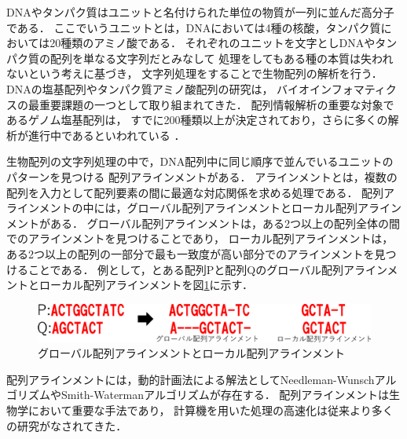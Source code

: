 DNAやタンパク質はユニットと名付けられた単位の物質が一列に並んだ高分子である．
ここでいうユニットとは，DNAにおいては4種の核酸，タンパク質においては20種類のアミノ酸である．
それぞれのユニットを文字としDNAやタンパク質の配列を単なる文字列だとみなして
処理をしてもある種の本質は失われないという考えに基づき，
文字列処理をすることで生物配列の解析を行う．
DNAの塩基配列やタンパク質アミノ酸配列の研究は，
バイオインフォマティクスの最重要課題の一つとして取り組まれてきた．
配列情報解析の重要な対象であるゲノム塩基配列は，
すでに200種類以上が決定されており，さらに多くの解析が進行中であるといわれている
\cite{浅井潔2005バイオインフォマティクス}．

生物配列の文字列処理の中で，DNA配列中に同じ順序で並んでいるユニットのパターンを見つける
配列アラインメントがある\cite{須戸里織2011バイオインフォマティクスゲノム配列から
機能解析へバイオインフォマティクスゲノム配列から機能解析へ}．
アラインメントとは，複数の配列を入力として配列要素の間に最適な対応関係を求める処理である．
配列アラインメントの中には，グローバル配列アラインメントとローカル配列アラインメントがある．
グローバル配列アラインメントは，ある2つ以上の配列全体の間でのアラインメントを見つけることであり，
ローカル配列アラインメントは，ある2つ以上の配列の一部分で最も一致度が高い部分でのアラインメントを見つけることである．
例として，とある配列Pと配列Qのグローバル配列アラインメントとローカル配列アラインメントを図\ref{fig:grlc}に示す．
\begin{figure}[t!]
\begin{center}
\includegraphics[keepaspectratio,scale=0.5]{fig/2/grlc.eps}
\caption{グローバル配列アラインメントとローカル配列アラインメント}
\label{fig:grlc}
\end{center}
\end{figure}

配列アラインメントには，動的計画法による解法としてNeedleman-Wunschアルゴリズム\cite{needleman1970general}やSmith-Watermanアルゴリズム\cite{smith1981identification}が存在する．
配列アラインメントは生物学において重要な手法であり，
計算機を用いた処理の高速化は従来より多くの研究がなされてきた\cite{須戸里織2011gpu,宗川裕馬2008統合開発環境,sandes2011smith,liu2015accelerating,伊野文彦2007gpu}．

